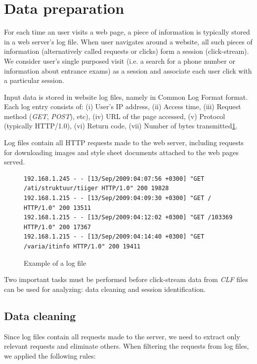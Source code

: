 \documentclass[12pt, english,a4paper]{article}
\begin{document}
\section{Data preparation} 
For each time an user visits a web page, a piece of information is typically stored in a web server's log file. When user navigates around a website, all such pieces of information (alternatively called requests or clicks) form a session (click-stream). We consider user's single purposed visit  (i.e. a search for a phone number or information about entrance exams) as a session and associate each user click with a particular session. 

Input data is stored in website log files, namely in Common Log Format\cite{ref_clf} format. Each log entry consists of:  (i) User's IP address, (ii) Access time, (iii) Request method (\emph{GET}, \emph{POST}), etc), (iv) URL of the page accessed, (v) Protocol (typically HTTP/1.0), (vi) Return code, (vii) Number of bytes transmitted\ref{log_sample}.

Log files contain all HTTP requests made to the web server, including requests for downloading images and style sheet documents attached to the web pages served.

\begin{figure}[h]
{\tiny
\begin{verbatim}
192.168.1.245 - - [13/Sep/2009:04:07:56 +0300] "GET /ati/struktuur/tiiger HTTP/1.0" 200 19828
192.168.1.215 - - [13/Sep/2009:04:09:30 +0300] "GET / HTTP/1.0" 200 13511
192.168.1.215 - - [13/Sep/2009:04:12:02 +0300] "GET /103369 HTTP/1.0" 200 17367
192.168.1.215 - - [13/Sep/2009:04:14:40 +0300] "GET /varia/itinfo HTTP/1.0" 200 19411
\end{verbatim}
}
\label{log_sample}
\caption{Example of a log file}
\end{figure}

Two important tasks must be performed before click-stream data from \emph{CLF} files can be used for analyzing: data cleaning and session identification.







\subsection{Data cleaning}
Since log files contain all requests made to the server, we need to extract only relevant requests and eliminate others. When filtering the requests from log files, we applied the following rules:
\end{document}
